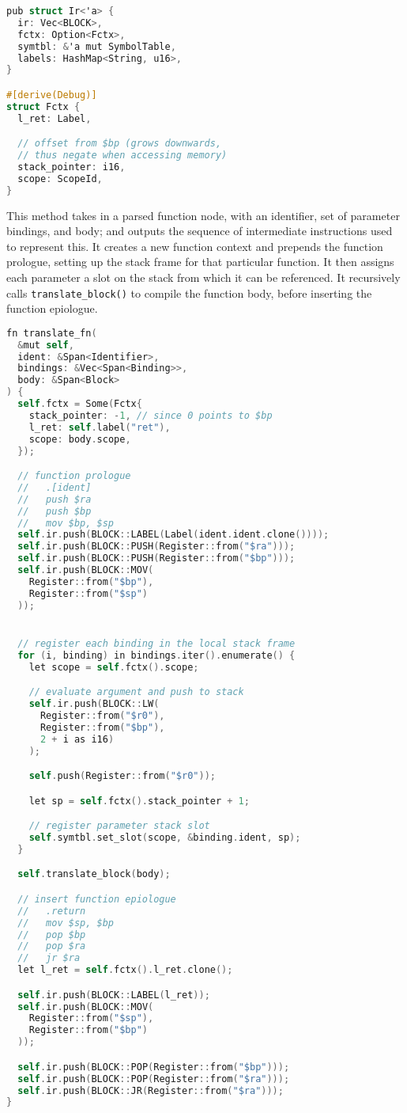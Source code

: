 \begin{lstlisting}[language=C]
pub struct Ir<'a> {
  ir: Vec<BLOCK>,
  fctx: Option<Fctx>,
  symtbl: &'a mut SymbolTable,
  labels: HashMap<String, u16>,
}

#[derive(Debug)]
struct Fctx {
  l_ret: Label,

  // offset from $bp (grows downwards, 
  // thus negate when accessing memory)
  stack_pointer: i16, 
  scope: ScopeId,
}
\end{lstlisting}

This method takes in a parsed function node, with an identifier, set of parameter bindings, and body; and outputs the sequence of intermediate instructions used to represent this. It creates a new function context and prepends the function prologue, setting up the stack frame for that particular function. It then assigns each parameter a slot on the stack from which it can be referenced. It recursively calls \texttt{translate\_block()} to compile the function body, before inserting the function epiologue.

\label{translate_fn}
\begin{lstlisting}[language=C]
fn translate_fn(
  &mut self, 
  ident: &Span<Identifier>, 
  bindings: &Vec<Span<Binding>>, 
  body: &Span<Block>
) {
  self.fctx = Some(Fctx{
    stack_pointer: -1, // since 0 points to $bp
    l_ret: self.label("ret"),
    scope: body.scope,
  });

  // function prologue
  //   .[ident]
  //   push $ra 
  //   push $bp
  //   mov $bp, $sp
  self.ir.push(BLOCK::LABEL(Label(ident.ident.clone())));
  self.ir.push(BLOCK::PUSH(Register::from("$ra")));
  self.ir.push(BLOCK::PUSH(Register::from("$bp")));
  self.ir.push(BLOCK::MOV(
    Register::from("$bp"), 
    Register::from("$sp")
  ));


  // register each binding in the local stack frame
  for (i, binding) in bindings.iter().enumerate() {
    let scope = self.fctx().scope;

    // evaluate argument and push to stack 
    self.ir.push(BLOCK::LW(
      Register::from("$r0"), 
      Register::from("$bp"), 
      2 + i as i16)
    );

    self.push(Register::from("$r0"));

    let sp = self.fctx().stack_pointer + 1; 

    // register parameter stack slot 
    self.symtbl.set_slot(scope, &binding.ident, sp);
  }

  self.translate_block(body);

  // insert function epiologue
  //   .return
  //   mov $sp, $bp
  //   pop $bp
  //   pop $ra
  //   jr $ra
  let l_ret = self.fctx().l_ret.clone();

  self.ir.push(BLOCK::LABEL(l_ret));
  self.ir.push(BLOCK::MOV(
    Register::from("$sp"), 
    Register::from("$bp")
  ));

  self.ir.push(BLOCK::POP(Register::from("$bp")));
  self.ir.push(BLOCK::POP(Register::from("$ra")));
  self.ir.push(BLOCK::JR(Register::from("$ra")));
}
\end{lstlisting}

